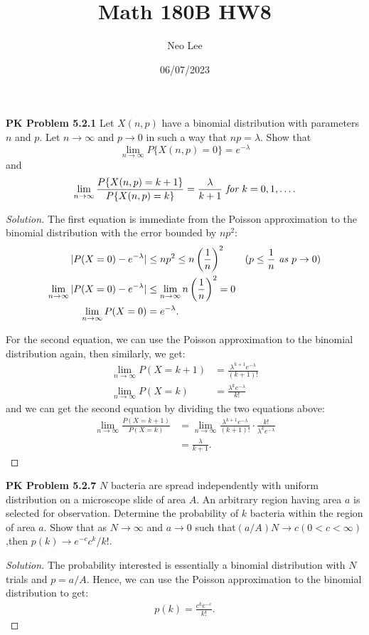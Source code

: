 \documentclass{article}
\title{Math 180B HW8}
\author{Neo Lee}
\date{06/07/2023}
\begin{document}
 

\maketitle 

\textbf{PK Problem 5.2.1}
Let $X(n, p)$ have a binomial distribution with parameters $n$ and $p$. 
Let $n\rightarrow \infty$  and $p \rightarrow 0$ in such a way that $np=\lambda$. 
Show that $$\lim_{n\rightarrow\infty}P\{X(n,p)=0\}=e^{-\lambda}$$
and $$\lim_{n\rightarrow\infty}\frac{P\{X(n,p)=k+1\}}{P\{X(n,p)=k\}}=\frac{\lambda}{k+1} \emph{ for } k = 0, 1, \dots .$$ 
\begin{proof}[Solution]
    The first equation is immediate from the Poisson approximation to the binomial distribution with the error bounded by $np^2$:
    \begin{align*}
        \vert P(X = 0) - e^{-\lambda} \vert & \le np^2 \le n\left(\frac{1}{n}\right)^2 \qquad (p \le \frac{1}{n} \emph{ as } p \rightarrow 0)\\
        \lim_{n\rightarrow\infty} \vert P(X = 0) - e^{-\lambda} \vert & \le \lim_{n\rightarrow\infty} n\left(\frac{1}{n}\right)^2 = 0\\
        \lim_{n\rightarrow\infty} P(X = 0) & = e^{-\lambda}.
    \end{align*}

    For the second equation, we can use the Poisson approximation to the binomial distribution again, then similarly, we get:
    \begin{align*}
        \lim_{n\rightarrow\infty}P(X = k+1) & = \frac{\lambda^{k+1}e^{-\lambda}}{(k+1)!} \\
        \lim_{n\rightarrow\infty}P(X = k) & = \frac{\lambda^{k}e^{-\lambda}}{k!} 
    \end{align*}
    and we can get the second equation by dividing the two equations above:
    \begin{align*}
        \lim_{n\rightarrow\infty} \frac{P(X = k+1)}{P(X = k)} & = \lim_{n\rightarrow\infty} \frac{\lambda^{k+1}e^{-\lambda}}{(k+1)!} \cdot \frac{k!}{\lambda^{k}e^{-\lambda}} \\
        & = \frac{\lambda}{k+1}.
    \end{align*}
\end{proof}
\bigbreak

\textbf{PK Problem 5.2.7}
$N$ bacteria are spread independently with uniform distribution on a microscope slide of area $A$. 
An arbitrary region having area $a$ is selected for observation. 
Determine the probability of $k$ bacteria within the region of area $a$. 
Show that as $N \rightarrow\infty$ and $a\rightarrow0$ such that$(a/A)N \rightarrow c(0<c<\infty)$,then $p(k)\rightarrow e^{-c}c^{k}/k!$.
\begin{proof}[Solution]
    The probability interested is essentially a binomial distribution with $N$ trials and $p = a/A$.
    Hence, we can use the Poisson approximation to the binomial distribution to get:
    \begin{align*}
        p(k) = \frac{c^{k}e^{-c}}{k!}.
    \end{align*}
\end{proof}
\bigbreak
\end{document}

